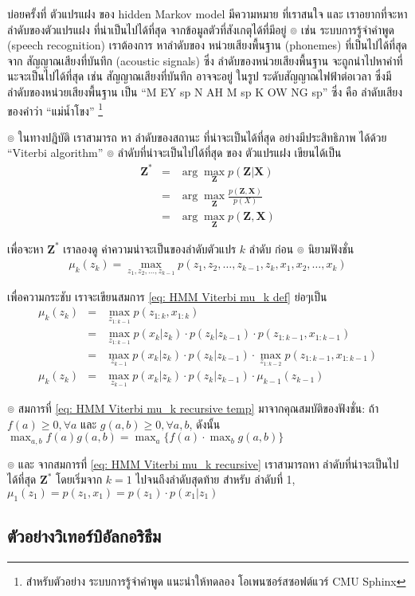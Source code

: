 บ่อยครั้งที่ ตัวแปรแฝง ของ hidden Markov model มีความหมาย ที่เราสนใจ และ เราอยากที่จะหา ลำดับของตัวแปรแฝง ที่น่าเป็นไปได้ที่สุด จากข้อมูลตัวที่สังเกตุได้ที่มีอยู่ 
๏ เช่น ระบบการรู้จำคำพูด (speech recognition) เราต้องการ หาลำดับของ หน่วยเสียงพื้นฐาน (phonemes) ที่เป็นไปได้ที่สุดจาก สัญญาณเสียงที่บันทึก (acoustic signals)
ซึ่ง ลำดับของหน่วยเสียงพื้นฐาน  จะถูกนำไปหาคำที่นะจะเป็นไปได้ที่สุด
เช่น สัญญาณเสียงที่บันทึก อาจจะอยู่ ในรูป ระดับสัญญาณไฟฟ้าต่อเวลา ซึ่งมี ลำดับของหน่วยเสียงพื้นฐาน เป็น ``M EY sp N AH M sp K OW NG sp'' ซึ่ง คือ ลำดับเสียงของคำว่า ``แม่น้ำโขง''%
\footnote{สำหรับตัวอย่าง ระบบการรู้จำคำพูด แนะนำให้ทดลอง โอเพนซอร์สซอฟต์แวร์ CMU Sphinx}

๏ ในทางปฎิบัติ เราสามารถ หา ลำดับของสถานะ ที่น่าจะเป็นได้ที่สุด อย่างมีประสิทธิภาพ ได้ด้วย ``Viterbi algorithm''
๏ ลำดับที่น่าจะเป็นไปได้ที่สุด ของ ตัวแปรแฝง เขียนได้เป็น
\begin{eqnarray}
\textbf{Z}^* &=& \arg \max_{\textbf{Z}} p(\textbf{Z}|\textbf{X})
\label{eq: HMM Viterbi 1} \\
&=& \arg \max_{\textbf{Z}} \frac{p(\textbf{Z},\textbf{X})}{p(X)}
\nonumber \\
&=& \arg \max_{\textbf{Z}} p(\textbf{Z},\textbf{X})
\label{eq: HMM Viterbi 2}
\end{eqnarray}

เพื่อจะหา $\textbf{Z}^*$ เราลองดู  ค่าความน่าจะเป็นของลำดับตัวแปร $k$ ลำดับ ก่อน
๏ นิยามฟังชั่น 
\begin{eqnarray}
\mu_k(z_k) = \max_{z_1, z_2, \ldots, z_{k-1}} p(z_1, z_2, \ldots, z_{k-1}, z_k, x_1, x_2, \ldots, x_k)
\label{eq: HMM Viterbi mu_k def}
\end{eqnarray}

เพื่อความกระชับ เราจะเขียนสมการ \ref{eq: HMM Viterbi mu_k def} ย่อๆเป็น
\begin{eqnarray}
\mu_k(z_k) &=& \max_{z_{1:k-1}} p(z_{1:k}, x_{1:k})
\label{eq: HMM Viterbi mu_k def short} \\
&=& \max_{z_{1:k-1}} p(x_k|z_k) \cdot p(z_k|z_{k-1}) \cdot p(z_{1:k-1}, x_{1:k-1})
\nonumber \\
&=& \max_{z_{k-1}} p(x_k|z_k) \cdot p(z_k|z_{k-1}) \cdot \max_{z_{1:{k-2}}} p(z_{1:k-1}, x_{1:k-1})
\label{eq: HMM Viterbi mu_k recursive temp} \\
\mu_k (z_k) &=& \max_{z_{k-1}} p(x_k|z_k) \cdot p(z_k|z_{k-1}) \cdot \mu_{k-1} (z_{k-1})
\label{eq: HMM Viterbi mu_k recursive}
\end{eqnarray}

๏ สมการที่ \ref{eq: HMM Viterbi mu_k recursive temp} มาจากคุณสมบัติของฟังชั่น:
ถ้า $f(a) \geq 0, \forall a$ และ $g(a,b) \geq 0, \forall a,b$, ดังนั้น
$\max_{a,b} f(a) g(a,b) = \max_a \lbrace f(a) \cdot \max_b g(a,b) \rbrace$

๏ และ จากสมการที่ \ref{eq: HMM Viterbi mu_k recursive} เราสามารถหา ลำดับที่น่าจะเป็นไปได้ที่สุด $\textbf{Z}^*$ โดยเริ่มจาก $k=1$ ไปจนถึงลำดับสุดท้าย
สำหรับ ลำดับที่ 1, $\mu_1(z_1) = p(z_1, x_1) = p(z_1) \cdot p(x_1|z_1)$

\subsection{ตัวอย่างวิเทอร์บิอัลกอริธึม}